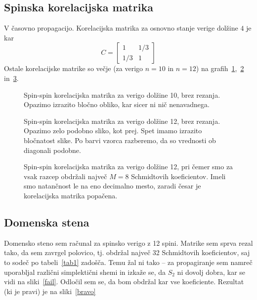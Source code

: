 \documentclass[12pt, a4 paper]{article}
\begin{document}
\subsection{Spinska korelacijska matrika}

V \v casovno propagacijo. Korelacijska matrika za osnovno stanje verige dol\v zine $4$ je kar
\begin{equation}
	C = \begin{bmatrix} 1 & 1/3 \\ 1/3 & 1\end{bmatrix}
\end{equation}
Ostale korelacijske matrike so ve\v cje (za verigo $n = 10$ in $n = 12$) na grafih~\ref{kor1},~\ref{kor2} in~\ref{kor3}.

\begin{figure}[H]\centering
	
	\vspace{-32pt}
	\caption{Spin-spin korelacijska matrika za verigo dol\v zine 10, brez rezanja. Opazimo izrazito blo\v cno
		obliko, kar sicer ni ni\v c nenavadnega.}
	\label{kor1}
\end{figure}

\begin{figure}[H]\centering
	
	\vspace{-32pt}
	\caption{Spin-spin korelacijska matrika za verigo dol\v zine 12, brez rezanja. Opazimo zelo podobno sliko, kot
		prej. Spet imamo izrazito blo\v cnatost slike. Po barvi vzorca razberemo, da so vrednosti ob diagonali
		podobne.}
	\label{kor2}
\end{figure}

\begin{figure}[H]\centering
	
	\vspace{-32pt}
	\caption{Spin-spin korelacijska matrika za verigo dol\v zine 12, pri \v cemer smo za vsak razcep obdr\v zali
		najve\v c $M = 8$ Schmidtovih koeficientov. Imeli smo natan\v cnost le na eno decimalno mesto, zaradi
		\v cesar je korelacijska matrika popa\v cena.}
	\label{kor3}
\end{figure}

\subsection{Domenska stena}

Domensko steno sem ra\v cunal za spinsko verigo z 12 spini. Matrike sem sprva rezal tako, da sem zavrgel polovico, tj.
obdr\v zal najve\v c 32 Schmidtovih koeficientov, saj to sode\v c po tabeli~\ref{tab1} zado\v s\v ca. Temu \v zal ni
tako -- za propagiranje sem namre\v c uporabljal razli\v cni simplekti\v cni shemi in izka\v ze se, da $S_2$ ni dovolj
dobra, kar se vidi na sliki~\ref{fail}. Odlo\v cil sem se, da bom obdr\v zal kar vse koeficiente. Rezultat (ki je pravi)
je na sliki~\ref{bravo}
\end{document}
